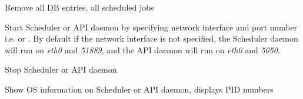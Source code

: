 \documentclass[letterpaper,10pt,english]{sphinxhowto}
\begin{document}

\begin{fulllineitems}
\label{COCOMA/02_how_to_use_it:cmdoption-ccmsh-p}
Remove all DB entries, all scheduled jobs

\end{fulllineitems}


\begin{fulllineitems}
\label{COCOMA/02_how_to_use_it:cmdoption-ccmsh--start}
Start Scheduler or API daemon by specifying network interface and port number i.e.  or . By default if the network interface is not specified, the Scheduler daemon will run on \emph{eth0} and \emph{51889}, and the API daemon will run on \emph{eth0} and \emph{5050}.

\end{fulllineitems}


\begin{fulllineitems}
\label{COCOMA/02_how_to_use_it:cmdoption-ccmsh--stop}
Stop Scheduler or API daemon

\end{fulllineitems}


\begin{fulllineitems}
\label{COCOMA/02_how_to_use_it:cmdoption-ccmsh--show}
Show OS information on Scheduler or API daemon, displays PID numbers

\end{fulllineitems}
\end{document}
